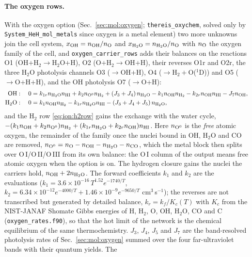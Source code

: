 \paragraph{The oxygen rows.} With the oxygen option
(Sec.~\ref{sec:mol:oxygen}; \texttt{thereis\_oxychem}, solved only by
\texttt{System\_HeH\_mol\_metals} since oxygen is a metal element) two more
unknowns join the cell system, $x_{\rm OH}=n_{\rm OH}/n_{\rm O}$ and
$x_{\rm H_2O}=n_{\rm H_2O}/n_{\rm O}$ with $n_{\rm O}$ the oxygen family of
the cell, and \texttt{oxygen\_carrier\_rows} adds their balances on the
reactions O1 (OH$+$H$_2\to$H$_2$O$+$H), O2 (O$+$H$_2\to$OH$+$H), their
reverses O1r and O2r, the three H$_2$O photolysis channels O3
($\to$OH$+$H), O4 ($\to$H$_2+$O($^1$D)) and O5 ($\to$O$+$H$+$H), and the OH
photolysis O7 ($\to$O$+$H):
\begin{align}
\text{OH}:\quad 0 &= k_{1r}n_{\rm H_2O}n_{\rm HI} + k_{2}n_{\rm O^0}n_{\rm H_2}
   + (J_3+J_4)\,n_{\rm H_2O}
   - k_{1}n_{\rm OH}n_{\rm H_2} - k_{2r}n_{\rm OH}n_{\rm HI} - J_7 n_{\rm OH},
   \label{eq:ion:ohrow}\\
\text{H}_2\text{O}:\quad 0 &= k_{1}n_{\rm OH}n_{\rm H_2}
   - k_{1r}n_{\rm H_2O}n_{\rm HI} - (J_3+J_4+J_5)\,n_{\rm H_2O},
   \label{eq:ion:h2orow}
\end{align}
and the H$_2$ row \eqref{eq:ion:h2row} gains the exchange with the water
cycle, $-(k_1 n_{\rm OH}+k_2 n_{\rm O^0})n_{\rm H_2}
+(k_{1r}n_{\rm H_2O}+k_{2r}n_{\rm OH})n_{\rm HI}$. Here $n_{\rm O^0}$ is the
\emph{free} atomic oxygen, the remainder of the family once the nuclei bound
in OH, H$_2$O and CO are removed, $n_{\rm O^0}=n_{\rm O}-n_{\rm OH}
-n_{\rm H_2O}-n_{\rm CO}$, which the metal block then splits over
O\,I/O\,II/O\,III from its own balance: the O\,I column of the output means
free atomic oxygen when the option is on. The hydrogen closure gains the
nuclei the carriers hold, $n_{\rm OH}+2n_{\rm H_2O}$. The forward
coefficients $k_1$ and $k_2$ are the \citet{Baulch2005} evaluations
($k_1=3.6\times10^{-16}\,T^{1.52}e^{-1740/T}$,
$k_2=6.34\times10^{-12}e^{-4000/T}+1.46\times10^{-9}e^{-9650/T}$
cm$^{3}$\,s$^{-1}$); the reverses are not transcribed but generated by
detailed balance, $k_{r}=k_{f}/K_c(T)$ with $K_c$ from the NIST-JANAF
Shomate Gibbs energies \citep{Chase1998} of H, H$_2$, O, OH, H$_2$O, CO and
C (\texttt{oxygen\_rates.f90}), so that the hot limit of the network is the
chemical equilibrium of the same thermochemistry. $J_3$, $J_4$, $J_5$ and
$J_7$ are the band-resolved photolysis rates of Sec.~\ref{sec:mol:oxygen}
summed over the four far-ultraviolet bands with their quantum yields. The

